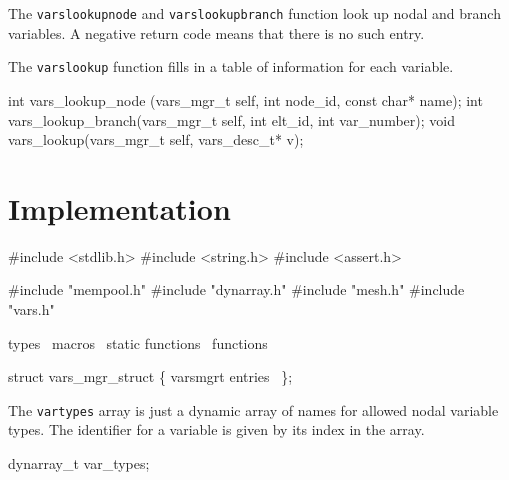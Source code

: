 The {\tt{}vars{}lookup{}node} and {\tt{}vars{}lookup{}branch} function
look up nodal and branch variables.  A negative return code
means that there is no such entry.

The {\tt{}vars{}lookup} function fills in a table of information
for each variable.

\nwenddocs{}\plusendmoddef
int vars_lookup_node  (vars_mgr_t self, int node_id, const char* name);
int vars_lookup_branch(vars_mgr_t self, int elt_id,  int var_number);
void vars_lookup(vars_mgr_t self, vars_desc_t* v);

\nwendcode{}\nwdocspar

\section{Implementation}

\nwenddocs{}\endmoddef
#include <stdlib.h>
#include <string.h>
#include <assert.h>

#include "mempool.h"
#include "dynarray.h"
#include "mesh.h"
#include "vars.h"

\LA{}types~{\nwtagstyle{}}\RA{}
\LA{}macros~{\nwtagstyle{}}\RA{}
\LA{}static functions~{\nwtagstyle{}}\RA{}
\LA{}functions~{\nwtagstyle{}}\RA{}
\nwendcode{}\nwdocspar

\nwenddocs{}\endmoddef
struct vars_mgr_struct \{
    \LA{}\code{}vars{}mgr{}t\edoc{} entries~{\nwtagstyle{}}\RA{}
\};

\nwendcode{}\nwdocspar

The {\tt{}var{}types} array is just a dynamic array of names for allowed
nodal variable types.  The identifier for a variable is given by its
index in the array.

\nwenddocs{}\endmoddef
dynarray_t var_types;
\nwendcode{}\nwdocspar

